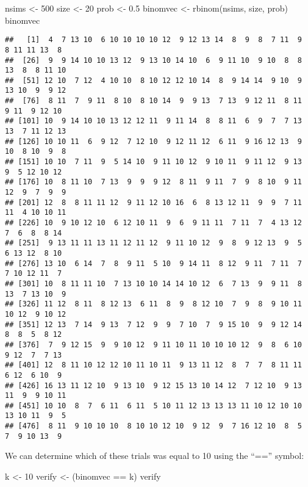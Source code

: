 \documentclass[
]{book}
\newenvironment{Shaded}{\begin{snugshade}}{\end{snugshade}}
\newcommand{\DecValTok}[1]{\textcolor[rgb]{0.00,0.00,0.81}{#1}}
\newcommand{\FloatTok}[1]{\textcolor[rgb]{0.00,0.00,0.81}{#1}}
\newcommand{\FunctionTok}[1]{\textcolor[rgb]{0.00,0.00,0.00}{#1}}
\newcommand{\NormalTok}[1]{#1}
\newcommand{\OtherTok}[1]{\textcolor[rgb]{0.56,0.35,0.01}{#1}}
\newcommand{\SpecialCharTok}[1]{\textcolor[rgb]{0.00,0.00,0.00}{#1}}
\begin{document}
\begin{Shaded}
\begin{Highlighting}[]
\NormalTok{nsims }\OtherTok{\textless{}{-}} \DecValTok{500}
\NormalTok{size }\OtherTok{\textless{}{-}} \DecValTok{20}
\NormalTok{prob }\OtherTok{\textless{}{-}} \FloatTok{0.5}
\NormalTok{binomvec }\OtherTok{\textless{}{-}} \FunctionTok{rbinom}\NormalTok{(nsims, size, prob)}
\NormalTok{binomvec}
\end{Highlighting}
\end{Shaded}

\begin{verbatim}
##   [1]  4  7 13 10  6 10 10 10 10 12  9 12 13 14  8  9  8  7 11  9  8 11 11 13  8
##  [26]  9  9 14 10 10 13 12  9 13 10 14 10  6  9 11 10  9 10  8  8 13  8  8 11 10
##  [51] 12 10  7 12  4 10 10  8 10 12 12 10 14  8  9 14 14  9 10  9 13 10  9  9 12
##  [76]  8 11  7  9 11  8 10  8 10 14  9  9 13  7 13  9 12 11  8 11  9 11  9 12 10
## [101] 10  9 14 10 10 13 12 12 11  9 11 14  8  8 11  6  9  7  7 13 13  7 11 12 13
## [126] 10 10 11  6  9 12  7 12 10  9 12 11 12  6 11  9 16 12 13  9 10  8 10  9  8
## [151] 10 10  7 11  9  5 14 10  9 11 10 12  9 10 11  9 11 12  9 13  9  5 12 10 12
## [176] 10  8 11 10  7 13  9  9  9 12  8 11  9 11  7  9  8 10  9 11 12  9  7  9  9
## [201] 12  8  8 11 11 12  9 11 12 10 16  6  8 13 12 11  9  9  7 11 11  4 10 10 11
## [226] 10  9 10 12 10  6 12 10 11  9  6  9 11 11  7 11  7  4 13 12  7  6  8  8 14
## [251]  9 13 11 11 13 11 12 11 12  9 11 10 12  9  8  9 12 13  9  5  6 13 12  8 10
## [276] 13 10  6 14  7  8  9 11  5 10  9 14 11  8 12  9 11  7 11  7  7 10 12 11  7
## [301] 10  8 11 11 10  7 13 10 10 14 14 10 12  6  7 13  9  9 11  8 13  7 13 10  9
## [326] 11 12  8 11  8 12 13  6 11  8  9  8 12 10  7  9  8  9 10 11 10 12  9 10 12
## [351] 12 13  7 14  9 13  7 12  9  9  7 10  7  9 15 10  9  9 12 14  8  8  5  8 12
## [376]  7  9 12 15  9  9 10 12  9 11 10 11 10 10 10 12  9  8  6 10  9 12  7  7 13
## [401] 12  8 11 10 12 12 10 11 10 11  9 13 11 12  8  7  7  8 11 11  6 12  6 10  9
## [426] 16 13 11 12 10  9 13 10  9 12 15 13 10 14 12  7 12 10  9 13 11  9  9 10 11
## [451] 10 10  8  7  6 11  6 11  5 10 11 12 13 13 13 11 10 12 10 10 13 10 11  9  5
## [476]  8 11  9 10 10 10  8 10 10 12 10  9 12  9  7 16 12 10  8  5  7  9 10 13  9
\end{verbatim}

We can determine which of these trials was equal to 10 using the ``=='' symbol:

\begin{Shaded}
\begin{Highlighting}[]
\NormalTok{k }\OtherTok{\textless{}{-}} \DecValTok{10}
\NormalTok{verify }\OtherTok{\textless{}{-}}\NormalTok{ (binomvec }\SpecialCharTok{==}\NormalTok{ k)}
\NormalTok{verify}
\end{Highlighting}
\end{Shaded}
\end{document}
